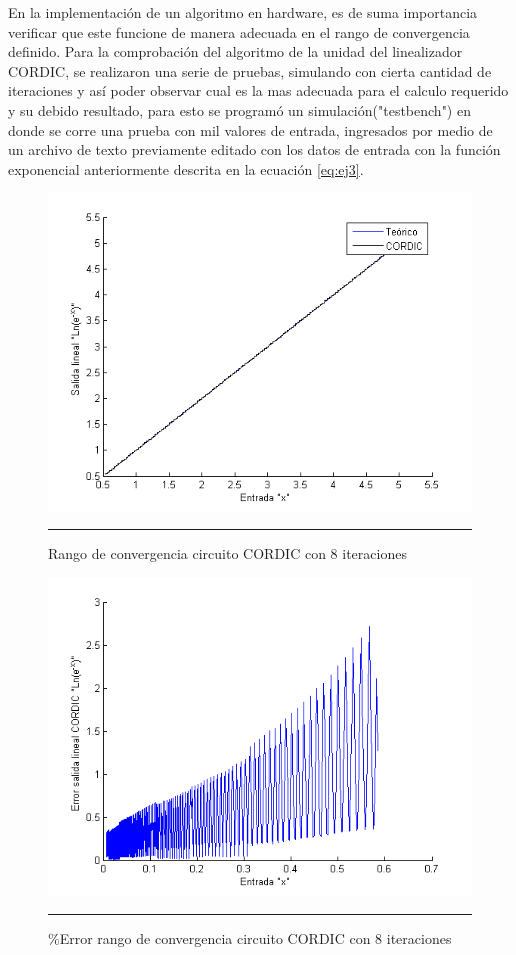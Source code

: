 En la implementación de un algoritmo en hardware, es de suma importancia verificar que este funcione de manera adecuada en el rango de convergencia definido. Para la comprobación del algoritmo de la unidad del linealizador CORDIC, se realizaron una serie de pruebas, simulando con cierta cantidad de iteraciones y así poder observar cual es la mas adecuada para el calculo requerido y su debido resultado, para esto se programó un simulación("testbench") en donde se corre una prueba con mil valores de entrada, ingresados por medio de un archivo de texto previamente editado con los datos de entrada con la función exponencial anteriormente descrita en la ecuación \ref{eq:ej3}. 


\begin{figure}[H]
  \centering
    \includegraphics[scale=0.7]{./RANGO_8iter.png}
    \rule{35em}{0.5pt}
  \caption[Rango de convergencia circuito CORDIC con 8 iteraciones]{Rango de convergencia circuito CORDIC con 8 iteraciones   }
  \label{fig:RG8}
\end{figure}

\begin{figure}[H]
  \centering
    \includegraphics[scale=0.7]{./RANGO_8iter_ERROR.png}
    \rule{35em}{0.5pt}
  \caption[\%Error rango de convergencia circuito CORDIC con 8 iteraciones]{\%Error rango de convergencia circuito CORDIC con 8 iteraciones }
  \label{fig:RGE8}
\end{figure}


